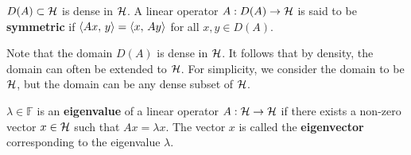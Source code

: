 \begin{definition}
    $D(A)\subset\mathcal{H}$ is dense in $\mathcal{H}$. A linear operator $A:D(A)\to\mathcal{H}$ is 
    said to be \textbf{symmetric} if $\left\langle {Ax},\, {y} \right\rangle = \left\langle {x},\, {Ay} \right\rangle$ for all 
    $x,y\in D(A)$.
\end{definition}
\begin{remark}
    Note that the domain $D(A)$ is dense in $\mathcal{H}$. It follows that by density, 
    the domain can often be extended to $\mathcal{H}$. For simplicity, we consider 
    the domain to be $\mathcal{H}$, but the domain can be any dense subset of $\mathcal{H}$.
\end{remark}

\begin{definition}
    $\lambda\in\mathbb{F}$ is an \textbf{eigenvalue} of a linear operator 
    $A:\mathcal{H}\to\mathcal{H}$ if there exists a non-zero vector $x\in\mathcal{H}$ such that 
    $Ax = \lambda x$. The vector $x$ is called the \textbf{eigenvector} 
    corresponding to the eigenvalue $\lambda$.
\end{definition} 

